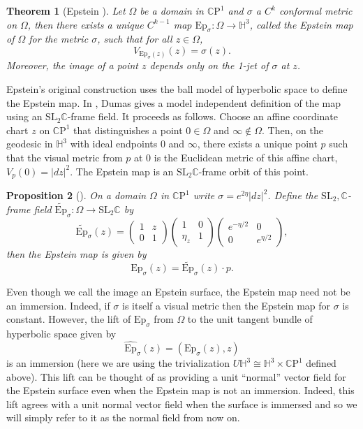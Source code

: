 \documentclass{amsart}
\newcommand{\C}{\mathbb{C}}
\newcommand{\CP}{\mathbb{C}\mathrm{P}}
\renewcommand{\H}{\mathbb{H}}
\newtheorem{thm}{Theorem}[section]
\newtheorem{prop}[thm]{Proposition}
\begin{document}
\begin{thm}[Epstein \cite{epstein1984}]
Let $\Omega$ be a domain in $\CP^1$  and $\sigma$ a $C^k$ conformal metric on $\Omega$, then there exists a unique $C^{k-1}$ map $\mathrm{Ep}_\sigma : \Omega \to \H^3$, called the Epstein map of $\Omega$ for the metric $\sigma$, such that for all $z \in \Omega$,
\[
V_{\mathrm{Ep}_\sigma(z)}(z) = \sigma(z).
\]
Moreover, the image of a point $z$ depends only on the 1-jet of $\sigma$ at $z$.
\label{epstein-map-def}
\end{thm}

Epstein's original construction uses the ball model of hyperbolic space to define the Epstein map. 
In \cite{dumas2017}, Dumas gives a model independent definition of the map using an $\text{SL}_2\C$-frame field. 
It proceeds as follows. 
Choose an affine coordinate chart $z$ on $\CP^1$ that distinguishes a point $0 \in \Omega$ and $\infty \notin \Omega$. 
Then, on the geodesic in $\H^3$ with ideal endpoints $0$ and $\infty$, there exists a unique point $p$ such that the visual metric from $p$ at $0$ is the Euclidean metric of this affine chart, $V_p(0) = |dz|^2$. 
The Epstein map is an $\mathrm{SL}_2\C$-frame orbit of this point.     


\begin{prop}[\cite{dumas2017}]
On a domain $\Omega$ in $\CP^1$ write $\sigma = e^{2\eta}|dz|^2$. Define the $\mathrm{SL}_2,\C$-frame field $\widetilde{\mathrm{Ep}}_\sigma: \Omega \to \mathrm{SL}_2\C$ by 
\[
\widetilde{\mathrm{Ep}}_\sigma(z) =
\begin{pmatrix}
1 & z \\
0 & 1
\end{pmatrix}
\begin{pmatrix}
1 & 0 \\
\eta_z & 1
\end{pmatrix}
\begin{pmatrix}
e^{-\eta/2} & 0 \\
0 & e^{\eta/2}
\end{pmatrix},
\]
then the Epstein map is given by 
\[
\mathrm{Ep}_\sigma(z) = \widetilde{\mathrm{Ep}}_\sigma(z) \cdot p.
\]
\end{prop}

 

Even though we call the image an Epstein surface, the Epstein map need not be an immersion. 
Indeed, if $\sigma$ is itself a visual metric then the Epstein map for $\sigma$ is constant. 
However, the lift of $\mathrm{Ep}_\sigma$ from $\Omega$ to the unit tangent bundle of hyperbolic space given by 
\[
\widehat{\mathrm{Ep}}_\sigma(z) = (\text{Ep}_\sigma(z),z) 
\] 
is an immersion (here we are using the trivialization $U\H^3 \cong \H^3 \times \CP^1$ defined above). 
This lift can be thought of as providing a unit ``normal'' vector field for the Epstein surface even when the Epstein map is not an immersion. 
Indeed, this lift agrees with a unit normal vector field when the surface is immersed and so we will simply refer to it as the normal field from now on. 
\end{document}
